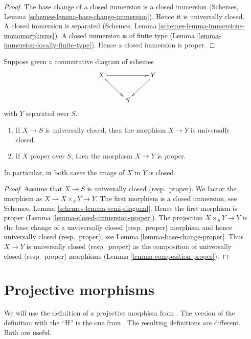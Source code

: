 \begin{proof}
The base change of a closed immersion is a closed immersion
(Schemes, Lemma \ref{schemes-lemma-base-change-immersion}).
Hence it is universally closed.
A closed immersion is separated
(Schemes, Lemma \ref{schemes-lemma-immersions-monomorphisms}).
A closed immersion is of finite type
(Lemma \ref{lemma-immersion-locally-finite-type}).
Hence a closed immersion is proper.
\end{proof}

\begin{lemma}
\label{lemma-image-proper-scheme-closed}
Suppose given a commutative diagram of schemes
$$
\xymatrix{
X \ar[rr] \ar[rd] & &
Y \ar[ld] \\
& S &
}
$$
with $Y$ separated over $S$.
\begin{enumerate}
\item If $X \to S$ is universally closed, then the morphism
$X \to Y$ is universally closed.
\item If $X$ proper over $S$, then the morphism $X \to Y$ is proper.
\end{enumerate}
In particular, in both cases the image of $X$ in $Y$ is closed.
\end{lemma}

\begin{proof}
Assume that $X \to S$ is universally closed (resp.\ proper).
We factor the morphism as $X \to X \times_S Y \to Y$.
The first morphism is a closed immersion, see
Schemes, Lemma \ref{schemes-lemma-semi-diagonal}.
Hence the first morphism is proper (Lemma \ref{lemma-closed-immersion-proper}).
The projection $X \times_S Y \to Y$ is the base change
of a unviversally closed (resp.\ proper) morphism and hence
universally closed (resp.\ proper), see Lemma \ref{lemma-base-change-proper}.
Thus $X \to Y$ is universally closed (resp.\ proper) as the composition
of universally closed (resp.\ proper) morphisms
(Lemma \ref{lemma-composition-proper}).
\end{proof}







\section{Projective morphisms}
\label{section-projective}

\noindent
We will use the definition of a projective morphism from \cite{EGA}.
The version of the definition with the ``H'' is the one
from \cite{H}. The resulting definitions are different. Both are useful.

